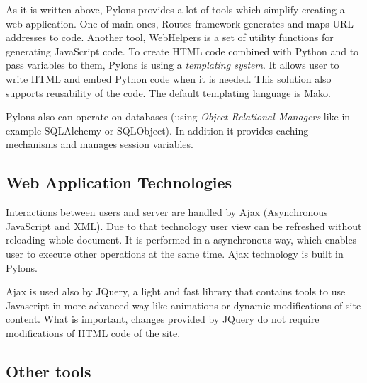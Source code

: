 As it is written above, Pylons provides a lot of tools which simplify creating a web application. One of main ones, Routes\cite{routes} framework generates and maps URL addresses to code. Another tool, WebHelpers\cite{webhelpers} is a set of utility functions for generating JavaScript\cite{javascript} code. To create HTML code combined with Python and to pass variables to them, Pylons is using a \emph{templating system}. It allows user to write HTML and embed Python code when it is needed\cite{templating_system}. This solution also supports reusability of the code. The default templating language is Mako\cite{mako}. 

Pylons also can operate on databases (using \emph{Object Relational Managers} like in example SQLAlchemy\cite{sqlalchemy} or SQLObject\cite{sqlobject}). In addition it provides caching mechanisms and manages session variables.

\subsection{Web Application Technologies}
\label{web_application_technologies}

Interactions between users and server are handled by Ajax\cite{ajax} (Asynchronous JavaScript and XML). Due to that technology user view can be refreshed without reloading whole document. It is performed in a asynchronous way, which enables user to execute other operations at the same time. Ajax technology is built in Pylons. 


Ajax is used also by JQuery\cite{jquery}, a light and fast library that contains tools to use Javascript in more advanced way like animations or dynamic modifications of site content. What is important, changes provided by JQuery do not require modifications of HTML code of the site.

\subsection{Other tools}
\label{other_technologies}

